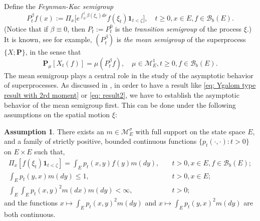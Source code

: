 \documentclass[12pt, a4paper]{amsart}
\theoremstyle{definition}
\newtheorem{asp}{Assumption}
\numberwithin{equation}{section}
\begin{document}
	Define the \emph{Feynman-Kac semigroup}
\begin{equation}
	P^\beta_tf(x)
	:= \Pi_x \big[e^{\int_0^{t} \beta(\xi_r)dr} f(\xi_t)\mathbf 1_{t<\zeta}\big],
	\quad t\geq 0, x\in E, f\in \mathscr B_b(E).
\end{equation}
	(Notice that if $\beta \equiv 0$, then $P_t:= P^0_t$ is the \emph{transition semigroup} of the process $\xi$.)
	It is known, see \cite[Proposition 2.27]{Li2011Measure-valued} for example, $(P^\beta_t)$ is \emph{the mean semigroup} of the superprocess $\{X; \mathbf P\}$, in the sense that 
\begin{equation} \label{eq: Ygalom type result without 2rd moment}
	\mathbf P_\mu [X_t(f)]
	= \mu(P^\beta_t f),
	\quad \mu \in \mathcal M^1_E,
	t \geq 0,f \in \mathscr B_b(E).
\end{equation}
    The  mean semigroup plays a central role in the study of the asymptotic behavior of superprocesses.
	As discussed in \cite{EvansPerkins1990Measure-valued}, in order to have a result like \eqref{eq: Ygalom type result with 2rd moment} or \eqref{eq: result2}, we have to establish the asymptotic behavior of the mean semigroup first.
	This can be done under the following assumptions on the spatial motion $\xi$:
\begin{asp} \label{asp: 1}
	There exists an $m \in \mathcal M_E^\sigma$ with full support on the state space $E$, and a family of strictly positive, bounded continuous functions $\{ p_t(\cdot,\cdot): t > 0 \}$ on $E \times E$ such that,
\begin{equation}\begin{split}
	\Pi_x[ f(\xi_t)\mathbf 1_{t < \zeta} ]
	= \int_E p_t(x,y) f(y) m(dy),
	&\quad t>0, x \in E,f \in \mathscr B_b(E);
	\\\int_E p_t(y,x)m(dy)
	\leq 1,	
	&\quad t>0,x\in E;
	\\\int_E \int_E p_t(x,y)^2 m(dx) m(dy)
	<\infty,
	&\quad t> 0;
\end{split}\end{equation}
	and the functions $x \mapsto \int_E p_t(x,y)^2 m(dy)$ and $x \mapsto \int_E p_t(y,x)^2 m(dy)$ are both continuous.
\end{asp}
\end{document}
